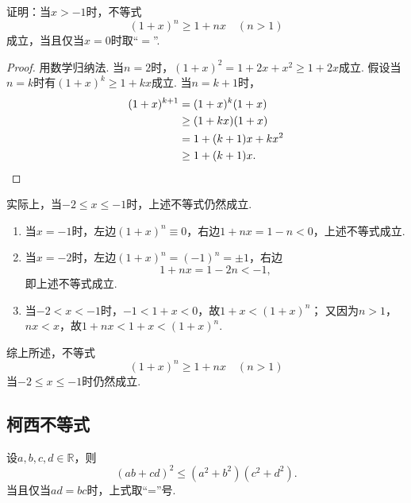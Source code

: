 \begin{example}
证明：当\(x > -1\)时，不等式\begin{equation}
(1+x)^n \geq 1+nx \quad (n>1)
\end{equation}成立，当且仅当\(x=0\)时取“\(=\)”.
\begin{proof}
用数学归纳法.
当\(n=2\)时，\((1+x)^2 = 1+2x+x^2 \geq 1+2x\)成立.
假设当\(n=k\)时有\((1+x)^k \geq 1+kx\)成立.
当\(n=k+1\)时，\begin{align*}
(1+x)^{k+1}
&= (1+x)^k (1+x) \\
&\geq (1+kx)(1+x) \\
&= 1 + (k+1)x + kx^2 \\
&\geq 1 + (k+1)x.
\qedhere
\end{align*}
\end{proof}
实际上，当\(-2 \leq x \leq -1\)时，上述不等式仍然成立.

\begin{enumerate}
\item 当\(x = -1\)时，左边\((1+x)^n \equiv 0\)，右边\(1+nx = 1 - n < 0\)，上述不等式成立.

\item 当\(x = -2\)时，左边\((1+x)^n = (-1)^n = \pm1\)，右边\[
1+nx = 1-2n < -1,
\]即上述不等式成立.

\item 当\(-2 < x < -1\)时，\(-1 < 1+x < 0\)，故\(1+x < (1+x)^n\)；
又因为\(n>1\)，\(nx<x\)，故\(1+nx < 1+x < (1+x)^n\).
\end{enumerate}
综上所述，不等式\[
(1+x)^n \geq 1+nx \quad (n>1)
\]当\(-2 \leq x \leq -1\)时仍然成立.
\end{example}

\subsection{柯西不等式}
\begin{theorem}
设\(a,b,c,d\in\mathbb{R}\)，则
\begin{equation}
	(ab+cd)^2
	\leq
	(a^2+b^2)(c^2+d^2).
\end{equation}
当且仅当\(ad=bc\)时，上式取“=”号.
\end{theorem}

